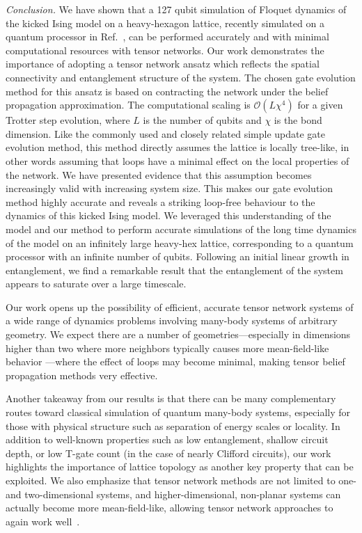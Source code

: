 \documentclass[%
 superscriptaddress,
 amsmath,amssymb,
 prx, nofootinbib,
]{revtex4-2}
\begin{document}
\emph{Conclusion.} 
We have shown that a 127 qubit simulation of Floquet dynamics of the kicked Ising model on a heavy-hexagon lattice, recently simulated on a quantum processor in Ref.~\cite{kim2023}, can be performed accurately and with minimal computational resources with tensor networks. Our work  demonstrates the importance of adopting a tensor network ansatz which  reflects the spatial connectivity and entanglement structure of the system. The chosen gate evolution method for this ansatz is based on contracting the network under the belief propagation approximation. The computational scaling is $\mathcal{O}(L \chi^{4})$ for a given Trotter step evolution, where $L$ is the number of qubits and $\chi$ is the bond dimension. 
Like the commonly used and closely related simple update gate evolution method, this method directly assumes the lattice is locally tree-like, in other words assuming that loops have a minimal effect on the local properties of the network. We have presented evidence that this assumption becomes increasingly valid with increasing system size. This makes our gate evolution method highly accurate and reveals a striking loop-free behaviour to the dynamics of this kicked Ising model. We leveraged this understanding of the model and our method to perform accurate simulations of the long time dynamics of the model on an infinitely large heavy-hex lattice, corresponding to a quantum processor with an infinite number of qubits. Following an initial linear growth in entanglement, we find a remarkable result that the entanglement of the system appears to saturate over a large timescale.

Our work opens up the possibility of efficient, accurate tensor network systems of a wide range of dynamics problems involving many-body systems of arbitrary geometry. We expect there are a number of geometries---especially in dimensions higher than two where more neighbors typically causes more mean-field-like behavior \cite{Vlaar2021}---where the effect of loops may become minimal, making tensor belief propagation methods very effective.

Another takeaway from our results is that there can be many complementary routes toward classical simulation of quantum many-body systems, especially for those with physical structure such as separation of energy scales or locality. In addition to well-known properties such as low entanglement, shallow circuit depth, or low T-gate count (in the case of nearly Clifford circuits), our work highlights the importance of 
lattice topology %
as another key property that can be exploited. We also emphasize that tensor network methods are not limited to one- and two-dimensional systems, and higher-dimensional, non-planar systems can actually become more mean-field-like, allowing tensor network approaches to again work well~\cite{tindall2022quantum, searle2023exact}. 
\end{document}
